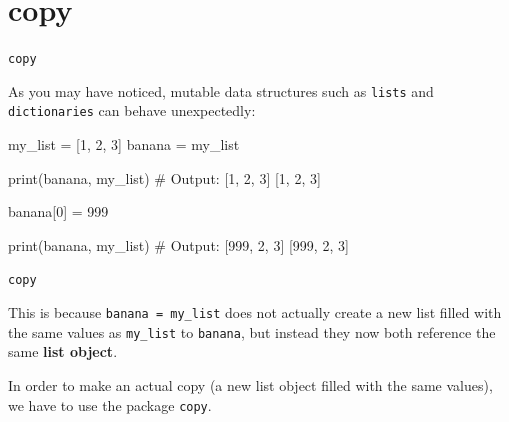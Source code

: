 \section{copy}

\begin{frame}[plain]
    \sectionpage
\end{frame}

\begin{frame}[fragile]{\texttt{copy}}

    As you may have noticed, mutable data structures such as \texttt{lists} and \texttt{dictionaries} can behave unexpectedly:
    
    \begin{pythoncode}

my_list = [1, 2, 3]
banana = my_list

print(banana, my_list)
# Output: [1, 2, 3] [1, 2, 3]

banana[0] = 999

print(banana, my_list)
# Output: [999, 2, 3] [999, 2, 3]

    \end{pythoncode}


\end{frame}


\begin{frame}[fragile]{\texttt{copy}}

    This is because \texttt{banana = my\_list} does not actually create a new list filled with the same values as \texttt{my\_list} to \texttt{banana},
    but instead they now both reference the same \textbf{list object}.


    \vspace{1em}

    In order to make an actual copy (a new list object filled with the same values), we have to use the package \texttt{copy}.


\end{frame}




